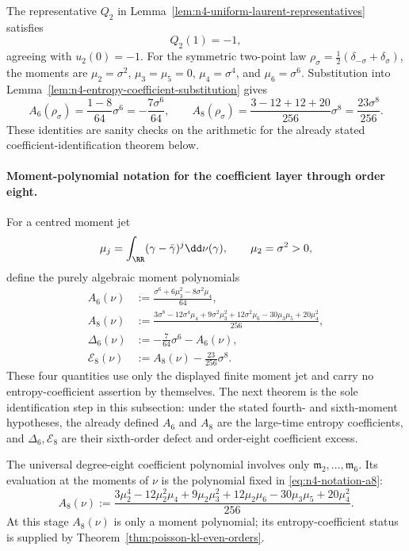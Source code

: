 \begin{remark}
The representative \(Q_2\) in
Lemma~\ref{lem:n4-uniform-laurent-representatives} satisfies
\[
Q_2(1)=-1,
\]
agreeing with \(u_2(0)=-1\).  For the symmetric two-point law
\(\rho_\sigma=\tfrac12(\delta_{-\sigma}+\delta_\sigma)\), the moments are
\(\mu_2=\sigma^2\), \(\mu_3=\mu_5=0\), \(\mu_4=\sigma^4\), and
\(\mu_6=\sigma^6\).  Substitution into
Lemma~\ref{lem:n4-entropy-coefficient-substitution} gives
\[
A_6(\rho_\sigma)=\frac{1-8}{64}\sigma^6
=-\frac{7\sigma^6}{64},
\qquad
A_8(\rho_\sigma)=\frac{3-12+12+20}{256}\sigma^8
=\frac{23\sigma^8}{256}.
\]
These identities are sanity checks on the arithmetic for the already stated
coefficient-identification theorem below.
\end{remark}

\paragraph{Moment-polynomial notation for the coefficient layer through order eight.}%
\label{par:eighth-order-coefficient-notation}
For a centred moment jet
\[
\mu_j=\int_{\RR}(\gamma-\bar{\gamma})^j\dd\nu(\gamma),
\qquad \mu_2=\sigma^2>0,
\]
define the purely algebraic moment polynomials
\begin{align}
A_6(\nu)
&:=\frac{\sigma^6+6\mu_3^2-8\sigma^2\mu_4}{64},
\label{eq:n4-notation-a6}\\
A_8(\nu)
&:=\frac{3\sigma^8-12\sigma^4\mu_4+9\sigma^2\mu_3^2
+12\sigma^2\mu_6-30\mu_3\mu_5+20\mu_4^2}{256},
\label{eq:n4-notation-a8}\\
\Delta_6(\nu)
&:=-\frac{7}{64}\sigma^6-A_6(\nu),
\label{eq:n4-notation-delta6}\\
\mathcal E_8(\nu)
&:=A_8(\nu)-\frac{23}{256}\sigma^8.
\label{eq:n4-notation-e8}
\end{align}
These four quantities use only the displayed finite moment jet and carry no
entropy-coefficient assertion by themselves.  The next theorem is the sole
identification step in this subsection: under the stated fourth- and
sixth-moment hypotheses, the already defined \(A_6\) and \(A_8\) are the
large-time entropy coefficients, and \(\Delta_6,\mathcal E_8\) are their
sixth-order defect and order-eight coefficient excess.

\begin{lemma}%
\label{lem:formal-seventh-eighth-coefficient}
The universal degree-eight coefficient polynomial involves only
\(\mathfrak m_2,\ldots,\mathfrak m_6\).  Its evaluation at the moments of
\(\nu\) is the polynomial fixed in
\eqref{eq:n4-notation-a8}:
\begin{equation}\label{eq:formal-eighth-evaluated-polynomial}
A_8(\nu)
:=
\frac{3\mu_2^4-12\mu_2^2\mu_4+9\mu_2\mu_3^2
+12\mu_2\mu_6-30\mu_3\mu_5+20\mu_4^2}{256}.
\end{equation}
At this stage \(A_8(\nu)\) is only a moment polynomial; its
entropy-coefficient status is supplied by
Theorem~\ref{thm:poisson-kl-even-orders}.
\end{lemma}

